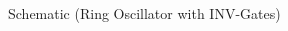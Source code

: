 \begin{center}
    Schematic (Ring Oscillator with INV-Gates)
    \begin{figure}[h]
        \begin{center}
            \begin{circuitdiagram}{60}{9}
            \end{circuitdiagram}
        \end{center}
    \end{figure}
\end{center}
